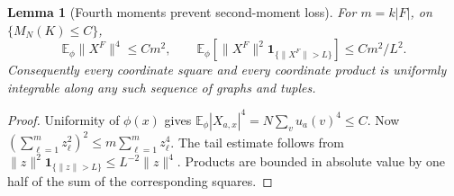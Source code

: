 \documentclass[11pt]{article}
\numberwithin{equation}{section}
\newtheorem{lemma}[theorem]{Lemma}
\theoremstyle{definition}
\theoremstyle{remark}
\newcommand{\E}{\mathbb E}
\newcommand{\one}{\mathbf 1}
\begin{document}
\begin{lemma}[Fourth moments prevent second-moment loss]\label{lem:UI}
For $m=k|F|$, on $\{M_N(K)\leq C\}$,
\begin{equation}\label{eq:UI}
 \E_\phi\|X^F\|^4\leq Cm^2,\qquad
 \E_\phi[\|X^F\|^2\one_{\{\|X^F\|>L\}}]\leq Cm^2/L^2.
\end{equation}
Consequently every coordinate square and every coordinate product is
uniformly integrable along any such sequence of graphs and tuples.
\end{lemma}
\begin{proof}
Uniformity of $\phi(x)$ gives
$\E_\phi|X_{a,x}|^4=N\sum_v u_a(v)^4\leq C$.
Now $(\sum_{\ell=1}^m z_\ell^2)^2\leq m\sum_{\ell=1}^m z_\ell^4$.
The tail estimate follows from
$\|z\|^2\one_{\{\|z\|>L\}}\leq L^{-2}\|z\|^4$.
Products are bounded in absolute value by one half of the sum of
the corresponding squares.
\end{proof}
\end{document}

